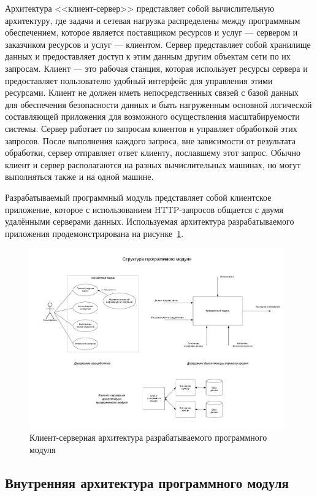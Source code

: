 Архитектура <<клиент-сервер>> представляет собой вычислительную архитектуру,
где задачи и сетевая нагрузка распределены между программным обеспечением,
которое является поставщиком ресурсов и услуг --- сервером и заказчиком ресурсов
и услуг --- клиентом.
Сервер представляет собой хранилище данных и предоставляет доступ к этим
данным другим объектам сети по их запросам.
Клиент --- это рабочая станция, которая использует ресурсы сервера и
предоставляет пользователю удобный интерфейс для управления этими ресурсами.
Клиент не должен иметь непосредственных связей с базой данных для
обеспечения безопасности данных и быть нагруженным основной логической
составляющей приложения для возможного осуществления масштабируемости системы.
Сервер работает по запросам клиентов и управляет обработкой этих запросов.
После выполнения каждого запроса, вне зависимости от результата обработки,
сервер отправляет ответ клиенту, пославшему этот запрос.
Обычно клиент и сервер располагаются на разных вычислительных машинах,
но могут выполняться также и на одной машине.

Разрабатываемый программный модуль представляет собой клиентское приложение,
которое с использованием HTTP-запросов общается с двумя удалёнными серверами данных.
Используемая архитектура разрабатываемого приложения продемонстрирована
на рисунке~\ref{fig:client_servers_schema}.
\begin{figure}[h!]
  \centering
  \includegraphics[width=110mm]{fig/client_servers_schema}
  \caption{Клиент-серверная архитектура разрабатываемого программного модуля}
  \label{fig:client_servers_schema}
\end{figure}



\subsection{Внутренняя архитектура программного модуля}

